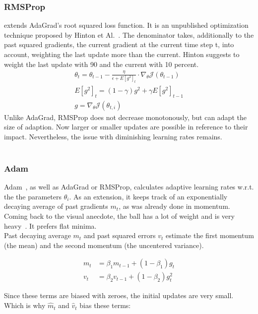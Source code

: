 \subsubsection{\gls{RMSProp}} extends \gls{AdaGrad}'s root squared loss function.
It is an unpublished optimization technique proposed by Hinton et Al.~\cite{rmsprop}.
The denominator takes, additionally to the past squared gradients, the current gradient at the current time step t,
into account, weighting the last update more than the current.
Hinton suggests to weight the last update with 90 and the current with 10 percent.
\begin{align}
    \theta_{t} = \theta_{t-1} - \frac{\eta}{\epsilon+E[g^2]_t} \cdot \nabla_\theta\mathcal{J}(\theta_{t-1})\label{eqn:rmsprop:1}\\
    E[g^2]_t = (1-\gamma)g^2+\gamma E[g^2]_{t-1}\label{eqn:rmsprop:2}\\
    g = \nabla_\theta\mathcal{J}(\theta_{t,i})\label{eqn:rmsprop:3}
\end{align}
Unlike \gls{AdaGrad}, \gls{RMSProp} does not decrease monotonously, but can adapt the size of adaption.
Now larger or smaller updates are possible in reference to their impact.
Nevertheless, the issue with diminishing learning rates remains.
\\\mbox{}\\
\subsubsection{\gls{Adam}}
\gls{Adam}~\cite{adam}, as well as \gls{AdaGrad} or \gls{RMSProp}, calculates adaptive learning rates w.r.t. the
the parameters $\theta_i$.
As an extension, it keeps track of an exponentially decaying average of past gradients $m_t$, as was already done in
momentum.\\
Coming back to the visual anecdote, the ball has a lot of weight and is very heavy~\cite{optimizersoverview}.
It prefers flat minima.\\
Past decaying average $m_t$ and past squared errors $v_t$ estimate the first momentum (the mean) and the second momentum
(the uncentered variance).

\begin{align}
    m_t &= \beta_1 m_{t-1} + (1 - \beta_1) g_t \label{eqn:adam:1}\\
    v_t &= \beta_2 v_{t-1} + (1 - \beta_2) g_t^2 \label{eqn:adam:2}
\end{align}

Since these terms are biased with zeroes, the initial updates are very small.
Which is why $\hat{m}_t$ and $\hat{v}_t$ bias these terms:

